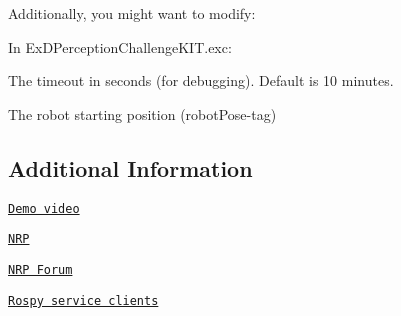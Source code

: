 Additionally, you might want to modify\+:

In {\ttfamily Ex\+D\+Perception\+Challenge\+K\+I\+T.\+exc}\+:


\begin{DoxyItemize}
\item The timeout in seconds (for debugging). Default is 10 minutes.
\item The robot starting position ({\ttfamily robot\+Pose}-\/tag)
\end{DoxyItemize}

\subsection*{Additional Information}


\begin{DoxyItemize}
\item \href{https://youtu.be/aice0elP7eI}{\tt Demo video}
\item \href{https://bitbucket.org/hbpneurorobotics/neurorobotics-platform}{\tt N\+RP}
\item \href{https://forum.humanbrainproject.eu/}{\tt N\+RP Forum}
\item \href{http://wiki.ros.org/ROS/Tutorials/WritingServiceClient%28python%29#rospy_tutorials.2BAC8-Tutorials.2BAC8-WritingServiceClient.Writing_the_Client_Node}{\tt Rospy service clients} 
\end{DoxyItemize}